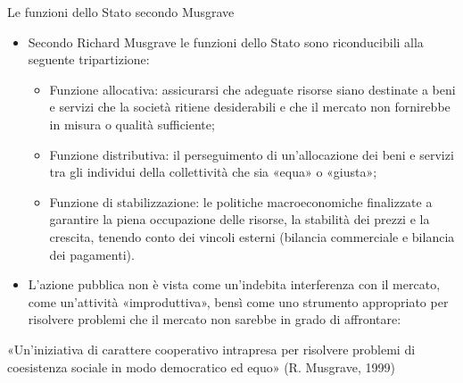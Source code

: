 \documentclass[aspectratio=64,12pt]{beamer}
\begin{document}
\begin{frame}{Le funzioni dello Stato secondo Musgrave}
\begin{itemize}
\item Secondo Richard Musgrave le funzioni dello Stato sono riconducibili alla seguente tripartizione:
\begin{itemize}
\item \alert{Funzione allocativa}: assicurarsi che adeguate risorse siano destinate a beni e servizi che la società ritiene desiderabili e che il mercato non fornirebbe in misura o qualità sufficiente;
\item \alert{Funzione distributiva}: il perseguimento di un’allocazione dei beni e servizi tra gli individui della collettività che sia «equa» o «giusta»;
\item \alert{Funzione di stabilizzazione}: le politiche macroeconomiche finalizzate a garantire la piena occupazione delle risorse, la stabilità dei prezzi e la crescita, tenendo conto dei vincoli esterni (bilancia commerciale e bilancia dei pagamenti).
\end{itemize}
\item L’azione pubblica non è vista come un’indebita interferenza con il mercato, come un’attività «improduttiva», bensì come uno strumento appropriato per risolvere problemi che il mercato non sarebbe in grado di affrontare:
\end{itemize}
\begin{quoting}
\fontsize{9.5}{10}\selectfont
«Un’iniziativa di carattere cooperativo intrapresa per risolvere problemi di coesistenza sociale in modo democratico ed equo» (R. Musgrave, 1999)
\end{quoting}
\end{frame}
\end{document}
